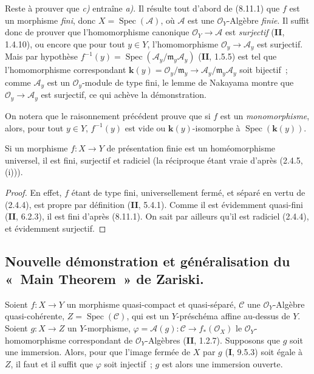 Reste à prouver que \emph{c)} entraîne \emph{a)}. Il résulte tout d'abord de
(8.11.1) que $f$ est un morphisme \emph{fini}, donc
$X=\operatorname{Spec}(\mathcal A)$, où $\mathcal A$ est une
$\mathcal O_Y$-Algèbre \emph{finie}. Il suffit donc de prouver que
l'homomorphisme canonique $\mathcal O_Y\to\mathcal A$ est \emph{surjectif}
(\textbf{II}, 1.4.10), ou encore que pour tout $y\in Y$, l'homomorphisme
$\mathcal O_y\to\mathcal A_y$ est surjectif. Mais par hypothèse
$f^{-1}(y)=\operatorname{Spec}(\mathcal A_y/\mathfrak m_y\mathcal A_y)$
(\textbf{II}, 1.5.5) est tel que l'homomorphisme correspondant
$\boldsymbol{k}(y)=\mathcal O_y/\mathfrak m_y\to
\mathcal A_y/\mathfrak m_y\mathcal A_y$ soit bijectif~; comme $\mathcal A_y$
est un $\mathcal O_y$-module de type fini, le lemme de Nakayama montre que
$\mathcal O_y\to\mathcal A_y$ est surjectif, ce qui achève la démonstration.

\begin{remark}[8.11.5.1]
\label{IV.8.11.5.1-fr}
On notera que le raisonnement précédent prouve que si $f$ est un
\emph{monomorphisme}, alors, pour tout $y\in Y$, $f^{-1}(y)$ est vide ou
$\boldsymbol{k}(y)$-isomorphe à $\operatorname{Spec}(\boldsymbol{k}(y))$.
\end{remark}

\begin{proposition}[8.11.6]
\label{IV.8.11.6-fr}
Si un morphisme $f:X\to Y$ de présentation finie est un homéomorphisme
universel, il est fini, surjectif et radiciel \textup{(la réciproque étant vraie
d'après (2.4.5, (i)))}.
\end{proposition}

\begin{proof}
En effet, $f$ étant de type fini, universellement fermé, et séparé en vertu de
(2.4.4), est propre par définition (\textbf{II}, 5.4.1). Comme il est évidemment
quasi-fini (\textbf{II}, 6.2.3), il est fini d'après (8.11.1). On sait par ailleurs
qu'il est radiciel (2.4.4), et évidemment surjectif.
\end{proof}

\subsection{Nouvelle démonstration et généralisation du «~Main Theorem~» de Zariski.}
\label{subsection:IV.8.12-fr}
\label{IV.8.12-fr}

\begin{lemma}[8.12.1]
\label{IV.8.12.1-fr}
Soient $f:X\to Y$ un morphisme quasi-compact et quasi-séparé, $\mathcal C$ une
$\mathcal O_Y$-Algèbre quasi-cohérente, $Z=\operatorname{Spec}(\mathcal C)$,
qui est un $Y$-préschéma affine au-dessus de $Y$. Soient $g:X\to Z$ un
$Y$-morphisme, $\varphi=\mathcal A(g):\mathcal C\to f_*(\mathcal O_X)$ le
$\mathcal O_Y$-homomorphisme correspondant de $\mathcal O_Y$-Algèbres
\textup{(\textbf{II}, 1.2.7)}. Supposons que $g$ soit une immersion. Alors, pour que l'image
fermée de $X$ par $g$ \textup{(\textbf{I}, 9.5.3)} soit égale à $Z$, il faut et il suffit que
$\varphi$ soit injectif~; $g$ est alors une immersion ouverte.
\end{lemma}

